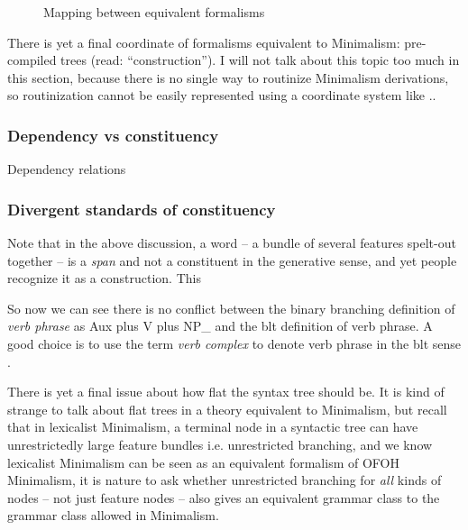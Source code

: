 \documentclass[../main.tex]{subfiles}
\begin{document}
\begin{figure}
    \centering
    
    \caption{Mapping between equivalent formalisms}
    \label{fig:minimalism-mapping}
\end{figure}

There is yet a final coordinate of formalisms equivalent to Minimalism: pre-compiled trees 
(read: ``construction''). I will not talk about this topic too much in this section, because there is no 
single way to routinize Minimalism derivations, so routinization cannot be easily represented 
using a coordinate system like .. 

\subsubsection{Dependency vs constituency}

Dependency relations

\subsubsection{Divergent standards of constituency}

Note that in the above discussion, a word -- a bundle of several features spelt-out together -- is a \emph{span}
and not a constituent in the generative sense, and yet people recognize it as a construction. This %

So now we can see there is no conflict between the binary branching definition of \emph{verb phrase} as Aux plus V plus NP_{} and the \ac{blt} definition of verb phrase. A good choice is to use the term 
\emph{verb complex} to denote verb phrase in the \ac{blt} sense \citep{Wilbur2014}.

There is yet a final issue about how flat the syntax tree should be. It is kind of strange to talk about 
flat trees in a theory equivalent to Minimalism, but recall that in lexicalist Minimalism, a terminal node 
in a syntactic tree can have unrestrictedly large feature bundles i.e. unrestricted branching, and 
we know lexicalist Minimalism can be seen as an equivalent formalism of OFOH Minimalism, it is nature 
to ask whether unrestricted branching for \emph{all} kinds of nodes -- not just feature nodes -- also gives 
an equivalent grammar class to the grammar class allowed in Minimalism.
\end{document}
